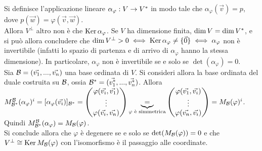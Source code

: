 \begin{remark}
	Si definisce l'applicazione lineare $\alpha_\varphi : V \to V^{*}$ in modo tale che
	$\alpha_\varphi(\vec{v}) = p$, dove $p(\vec{w}) = \varphi(\vec{v}, \vec{w})$. \\
	
	Allora $V^\perp$ altro non è che $\operatorname{Ker} \alpha_\varphi$. Se $V$ ha dimensione finita, $\dim V = \dim V^{*}$,
	e si può allora concludere che $\dim V^\perp > 0 \iff \Ker \alpha_\varphi \neq \{\vec{0}\} \iff \alpha_\varphi$ non è
	invertibile (infatti lo spazio di partenza e di arrivo di $\alpha_\varphi$ hanno la stessa dimensione). In
	particolare, $\alpha_\varphi$ non è invertibile se e solo se $\det(\alpha_\varphi) = 0$. \\
	
	Sia $\basis = (\vv{1}, ..., \vv{n})$ una base ordinata di $V$. Si consideri allora la base ordinata del
	duale costruita su $\mathcal{B}$, ossia $\dual{\basis} = (\vecdual{v_1}, ..., \vecdual{v_n})$. Allora
	$M_{\basisdual}^\basis(\alpha_\varphi)^i = [\alpha_\varphi(\vv{i})]_{\basisdual} = \Matrix{\varphi(\vec{v_i}, \vec{v_1}) \\ \vdots \\ \varphi(\vec{v_i}, \vec{v_n})} \underbrace{=}_{\varphi \text{ è simmetrica}}
	\Matrix{\varphi(\vec{v_1}, \vec{v_i}) \\ \vdots \\ \varphi(\vec{v_n}, \vec{v_i})} = M_\basis(\varphi)^i$. Quindi
	$M_{\mathcal{B}^{*}}^{\mathcal{B}}(\alpha_\varphi) = M_{\mathcal{B}}(\varphi)$. \\
	
	Si conclude allora che $\varphi$ è degenere se e solo se $\det (M_{\mathcal{B}}(\varphi)) = 0$ e che
	$V^\perp \cong \operatorname{Ker} M_{\mathcal{B}}(\varphi)$ con l'isomorfismo è il passaggio alle coordinate.
\end{remark}
